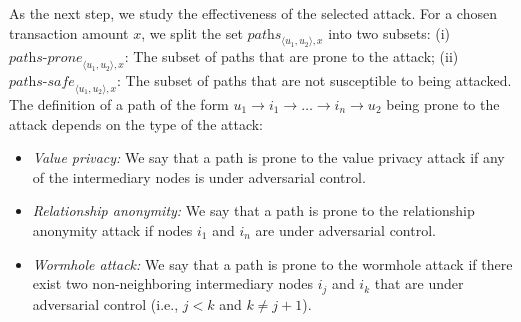 
As the next step, we study the effectiveness of the selected attack.
For a chosen transaction amount $x$,
we split the set $\textit{paths}_{\langle u_1, u_2 \rangle, x}$ into two subsets:
(i) $\textit{paths-prone}_{\langle u_1, u_2 \rangle, x}$: The subset of paths that are prone to the attack;
(ii) $\textit{paths-safe}_{\langle u_1, u_2 \rangle, x}$:  The subset of paths that are not susceptible to being attacked. 
The definition of a path of the form $u_1 \rightarrow i_1 \rightarrow  \ldots \rightarrow i_n \rightarrow u_2$  being 
prone to the attack depends on the type of the attack:
\begin{itemize}
	
	\item \textit{Value privacy:} We say that a path is prone to the 
	value privacy attack if any of the intermediary nodes is under adversarial control. 
	
	\item \textit{Relationship anonymity:} We say that a path  
	is prone to the relationship anonymity attack if nodes $i_1$ and $i_n$ are under adversarial control.
	
	\item \textit{Wormhole attack:} We say that a path  
	is prone to the wormhole attack if there exist two non-neighboring intermediary 
	nodes $i_j$ and $i_k$ that are under adversarial control (i.e., $j < k$ and $k \neq j + 1$). 
	
\end{itemize}


